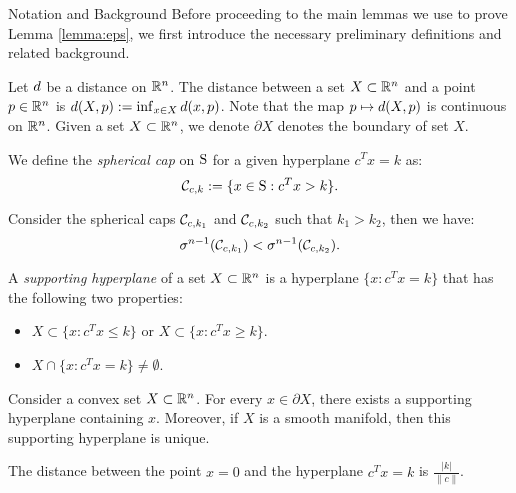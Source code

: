 \begin{subsection}{Notation and Background}
Before proceeding to the main lemmas we use to prove Lemma \ref{lemma:eps}, we first introduce the necessary preliminary definitions and related background.

Let $d$ be a distance on $\mathbb{R}^n$. The distance between a set $X \subset \mathbb{R}^n$ and a point $p \in \mathbb{R}^n$ is $d(X, p):=\inf_{x \in X}d(x,p)$. Note that the map $p \mapsto d(X,p)$ is continuous on $\mathbb{R}^n$. Given a set $X \subset \mathbb{R}^n$, we denote $\partial X$ denotes the boundary of set $X$.

\begin{definition}%
We define the \emph{spherical cap} on $\text{S}$ for a given hyperplane $c^Tx = k$ as:
\begin{equation*}\mathcal{C}_{c,k} := \{x \in \text{S} : c^Tx >k\}.\end{equation*}
\end{definition}

\begin{remark}\label{lemma:muMonotone}Consider the spherical caps $\mathcal{C}_{c, k_1}$ and $\mathcal{C}_{c, k_2}$ such that $k_1 > k_2$, then we have:
$$\sigma^{n-1}(\mathcal{C}_{c,k_1}) < \sigma^{n-1}(\mathcal{C}_{c,k_2}).$$
\end{remark}


\begin{definition}A \emph{supporting hyperplane} of a set $X \subset \mathbb{R}^n$ is a hyperplane $\{x:c^Tx = k\}$ that has the following two properties:
\begin{itemize}
\item $X \subset \{x: c^Tx \leq k\}$ or $X \subset \{x: c^Tx \geq k\}$.
\item $X \cap \{x: c^Tx = k\} \not= \emptyset$.
\end{itemize}
\end{definition}

\begin{remark}\label{suppHyperplaneRemark}\cite{boyd} Consider a convex set $X \subset \mathbb{R}^n$. For every $x \in \partial X$, there exists a supporting hyperplane containing $x$. Moreover, if $X$ is a smooth manifold, then this supporting hyperplane is unique.
\end{remark}

\begin{remark}\label{prop:distance}The distance between the point $x=0$ and the hyperplane $c^Tx = k$ is $\frac{|k|}{\|c\|}$.
\end{remark}


\end{subsection}
